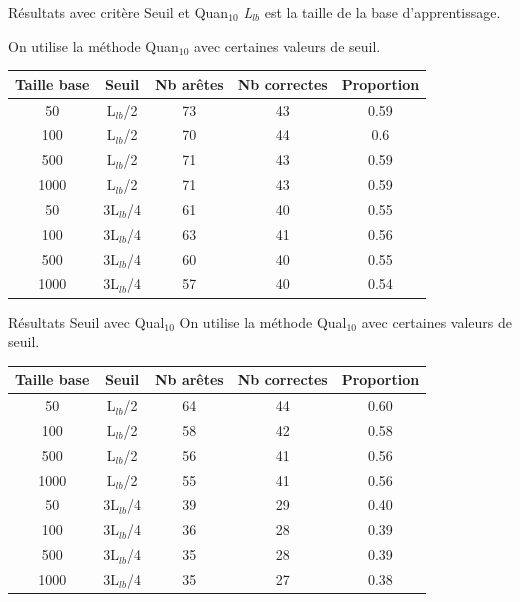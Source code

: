 \documentclass{beamer}
\begin{document}
\begin{frame}{Résultats avec critère Seuil et Quan$_{10}$}
\emph{L$_{lb}$} est la taille de la base d'apprentissage. 


On utilise la méthode Quan$_{10}$ avec certaines valeurs de seuil.

\begin{tabular}{|c|c|c|c|c|}
   \hline
   Taille base & Seuil & Nb arêtes & Nb correctes & Proportion\\
   \hline
   50 & L$_{lb}$/2 & 73 & 43 & 0.59  \\   
   \hline
   100 & L$_{lb}$/2 & 70 & 44 & 0.6  \\
   \hline
   500 & L$_{lb}$/2 & 71 & 43 & 0.59  \\
   \hline
   1000 & L$_{lb}$/2 & 71 & 43 & 0.59  \\
   \hline
   \hline
   50 & 3L$_{lb}$/4 & 61 & 40 & 0.55  \\
   \hline
   100 & 3L$_{lb}$/4 & 63 & 41 & 0.56  \\
   \hline
   500 & 3L$_{lb}$/4 & 60 & 40 & 0.55  \\
   \hline
   1000 & 3L$_{lb}$/4 & 57 & 40 & 0.54  \\
   \hline
\end{tabular}


\end{frame}

\begin{frame}{Résultats Seuil avec Qual$_{10}$}
On utilise la méthode Qual$_{10}$ avec certaines valeurs de seuil.
\begin{tabular}{|c|c|c|c|c|}
   \hline
   Taille base & Seuil & Nb arêtes & Nb correctes & Proportion\\
    \hline
   50 & L$_{lb}$/2 & 64 & 44 & 0.60  \\
   \hline
   100 & L$_{lb}$/2 & 58 & 42 & 0.58  \\
   \hline
   500 & L$_{lb}$/2 & 56 & 41 & 0.56  \\
   \hline
   1000 & L$_{lb}$/2 & 55 & 41 & 0.56  \\
   \hline
   \hline
   50 & 3L$_{lb}$/4 & 39 & 29 & 0.40  \\
   \hline
   100 & 3L$_{lb}$/4 & 36 & 28 & 0.39  \\
   \hline
   500 & 3L$_{lb}$/4 & 35 & 28 & 0.39  \\
   \hline
   1000 & 3L$_{lb}$/4 & 35 & 27 & 0.38  \\
   \hline
\end{tabular}
\end{frame}
\end{document}
